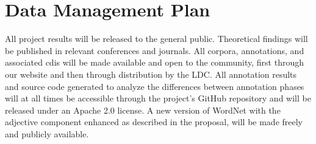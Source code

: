 \documentclass[11pt]{article}
\begin{document}
\section*{Data Management Plan}

All project results will be released to the general public. Theoretical findings will be published in relevant conferences and journals. All corpora, annotations, and associated {\sc cdi}s will be made available and open to the community, first through our website and then through distribution by the LDC. All annotation results and  
source code generated to 
analyze the differences  between annotation phases  will at all times be accessible through the project's GitHub repository and will be released under an Apache 2.0 license. A new version of WordNet with the adjective component enhanced as described in the proposal, will be made freely and publicly available. 

\end{document}
